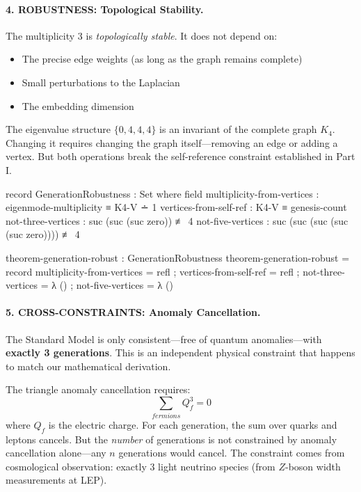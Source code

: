 \documentclass[11pt,a4paper]{book}
\def\text#1{#1}%
\begin{document}
\paragraph{4. ROBUSTNESS: Topological Stability.}

The multiplicity 3 is \emph{topologically stable}. It does not depend on:
\begin{itemize}
\item The precise edge weights (as long as the graph remains complete)
\item Small perturbations to the Laplacian
\item The embedding dimension
\end{itemize}

The eigenvalue structure $\{0, 4, 4, 4\}$ is an invariant of the complete graph $K_4$. Changing it requires changing the graph itself---removing an edge or adding a vertex. But both operations break the self-reference constraint established in Part I.

\begin{code}
record GenerationRobustness : Set where
  field
    multiplicity-from-vertices : eigenmode-multiplicity ≡ K4-V ∸ 1
    vertices-from-self-ref     : K4-V ≡ genesis-count
    not-three-vertices         : suc (suc (suc zero)) ≢ 4
    not-five-vertices          : suc (suc (suc (suc (suc zero)))) ≢ 4

theorem-generation-robust : GenerationRobustness
theorem-generation-robust = record
  { multiplicity-from-vertices = refl
  ; vertices-from-self-ref     = refl
  ; not-three-vertices         = λ ()
  ; not-five-vertices          = λ ()
  }
\end{code}

\paragraph{5. CROSS-CONSTRAINTS: Anomaly Cancellation.}

The Standard Model is only consistent---free of quantum anomalies---with \textbf{exactly 3 generations}. This is an independent physical constraint that happens to match our mathematical derivation.

The triangle anomaly cancellation requires:
\[
\sum_{\text{fermions}} Q_f^3 = 0
\]
where $Q_f$ is the electric charge. For each generation, the sum over quarks and leptons cancels. But the \emph{number} of generations is not constrained by anomaly cancellation alone---any $n$ generations would cancel. The constraint comes from cosmological observation: exactly 3 light neutrino species (from $Z$-boson width measurements at LEP).
\end{document}
